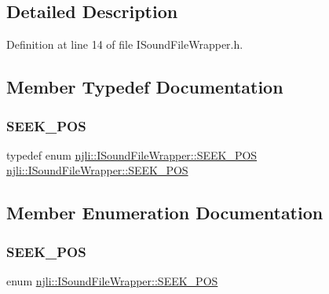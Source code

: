 \subsection{Detailed Description}


Definition at line 14 of file I\+Sound\+File\+Wrapper.\+h.



\subsection{Member Typedef Documentation}
\mbox{\label{classnjli_1_1_i_sound_file_wrapper_a5374e14efd1564c10852da7cfe31164a}} 
\subsubsection{\texorpdfstring{S\+E\+E\+K\+\_\+\+P\+OS}{SEEK\_POS}}
{\footnotesize\ttfamily typedef enum \mbox{\hyperlink{classnjli_1_1_i_sound_file_wrapper_ab4b07720cb2823b4f3f9fa98ee07a6e7}{njli\+::\+I\+Sound\+File\+Wrapper\+::\+S\+E\+E\+K\+\_\+\+P\+OS}}  \mbox{\hyperlink{classnjli_1_1_i_sound_file_wrapper_ab4b07720cb2823b4f3f9fa98ee07a6e7}{njli\+::\+I\+Sound\+File\+Wrapper\+::\+S\+E\+E\+K\+\_\+\+P\+OS}}}



\subsection{Member Enumeration Documentation}
\mbox{\label{classnjli_1_1_i_sound_file_wrapper_ab4b07720cb2823b4f3f9fa98ee07a6e7}} 
\subsubsection{\texorpdfstring{S\+E\+E\+K\+\_\+\+P\+OS}{SEEK\_POS}}
{\footnotesize\ttfamily enum \mbox{\hyperlink{classnjli_1_1_i_sound_file_wrapper_ab4b07720cb2823b4f3f9fa98ee07a6e7}{njli\+::\+I\+Sound\+File\+Wrapper\+::\+S\+E\+E\+K\+\_\+\+P\+OS}}}

